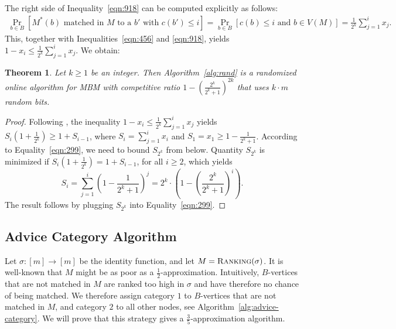 \documentclass[a4paper]{article}
\newcommand{\Rank}{\textsc{Ranking}}
\newtheorem{theorem}{Theorem}
\begin{document}
The right side of Inequality~\ref{eqn:918} can be computed explicitly as follows:
\begin{eqnarray}
 \nonumber \Pr_{b \in B} \left[ M^*(b) \text{ matched in $M$ to a $b'$ with $c(b') \le i$} \right] = \Pr_{b \in B} \left[ c(b) \le i \text{ and } b \in V(M) \right] =  \frac{1}{2^k} \sum_{j=1}^{i} x_j. \label{eqn:943}
\end{eqnarray}
This, together with Inequalities~\ref{eqn:456} and \ref{eqn:918}, yields $1-x_i \le \frac{1}{2^k} \sum_{j=1}^{i} x_j$.
We obtain:
\begin{theorem}\label{thm:rand}
 Let $k \ge 1$ be an integer. Then Algorithm~\ref{alg:rand} is a randomized online algorithm for
 \textsc{MBM} with competitive ratio
 $1 - \left( \frac{2^k}{2^k + 1}\right)^{2k}$
 that uses $k \cdot m$ random bits.
\end{theorem}
\begin{proof}
 Following \cite{bm08}, the inequality $1-x_i \le \frac{1}{2^k} \sum_{j=1}^{i} x_j$ yields
 $S_i (1 + \frac{1}{2^k}) \ge 1 + S_{i-1}$,
 where $S_i = \sum_{j=1}^i x_i$ and $S_1 = x_1 \ge 1- \frac{1}{2^k + 1}$. According to Equality~\ref{eqn:299},
 we need to bound $S_{2^k}$ from below. Quantity $S_{2^k}$ is minimized if $S_i (1 + \frac{1}{2^k}) = 1 + S_{i-1}$,
 for all $i \ge 2$, which yields
 $$S_{i} = \sum_{j=1}^{i} (1 - \frac{1}{2^k + 1})^j = 2^k  \cdot \left( 1 - \left( \frac{2^k}{2^k + 1}\right)^i \right).$$
 The result follows by plugging $S_{2^k}$ into Equality~\ref{eqn:299}.
\end{proof}


\subsection{Advice Category Algorithm}
Let $\sigma: [m] \rightarrow [m]$ be the identity function, and let $M = \Rank(\sigma)$. It is well-known
that $M$ might be as poor as a $\frac{1}{2}$-approximation. Intuitively, $B$-vertices that are not matched
in $M$ are ranked too high in $\sigma$ and have therefore no chance of being matched. We therefore assign
category $1$ to $B$-vertices that are not matched in $M$, and category $2$ to all other nodes, see
Algorithm~\ref{alg:advice-category}. We will prove that this strategy gives a $\frac{3}{5}$-approximation algorithm.
\end{document}
